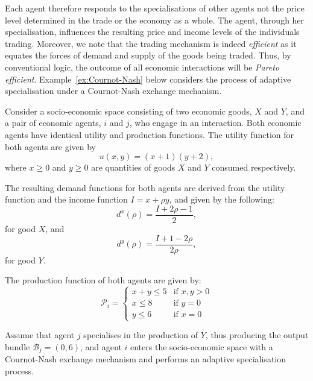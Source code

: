 Each agent therefore responds to the specialisations of other agents not the price level determined in the trade or the economy as a whole. The agent, through her specialisation, influences the resulting price and income levels of the individuals trading. Moreover, we note that the trading mechanism is indeed \emph{efficient} as it equates the forces of demand and supply of the goods being traded. Thus, by conventional logic, the outcome of all economic interactions will be \emph{Pareto efficient}. Example~\ref{ex:Cournot-Nash} below considers the process of adaptive specialisation under a Cournot-Nash exchange mechanism.

\begin{example} \label{ex:Cournot-Nash}
Consider a socio-economic space consisting of two economic goods, $X$ and $Y$, and a pair of economic agents, $i$ and $j$, who engage in an interaction. Both economic agents have identical utility and production functions. The utility function for both agents are given by
\begin{equation}
    u(x,y) = (x + 1) (y + 2) ,
\end{equation}
where $x \geqslant 0$ and $y \geqslant 0$ are quantities of goods $X$ and $Y$ consumed respectively.

The resulting demand functions for both agents are derived from the utility function and the income function $I = x + \rho y$, and given by the following:
\begin{equation}
d^{x}(\rho) = \frac{I + 2 \rho - 1}{2} ,
\end{equation}
for good $X$, and
\begin{equation}
d^{y}(\rho) = \frac{I + 1 - 2 \rho }{2 \rho} ,
\end{equation}
for good $Y$.

The production function of both agents are given by:
\[ \mathcal{P}_{i} = \left\{ \begin{array}{ll}
         x + y \leqslant 5 & \mbox{if $x,y > 0$}\\
		 x \leqslant 8 & \mbox{if $y = 0$}\\
         y \leqslant 6 & \mbox{if $x = 0$}\end{array} \right. \]

Assume that agent $j$ specialises in the production of $Y$, thus producing the output bundle $\mathcal{B}_{j} = (0,6)$, and agent $i$ enters the socio-economic space with a Cournot-Nash exchange mechanism and performs an adaptive specialisation process.


\end{example}
